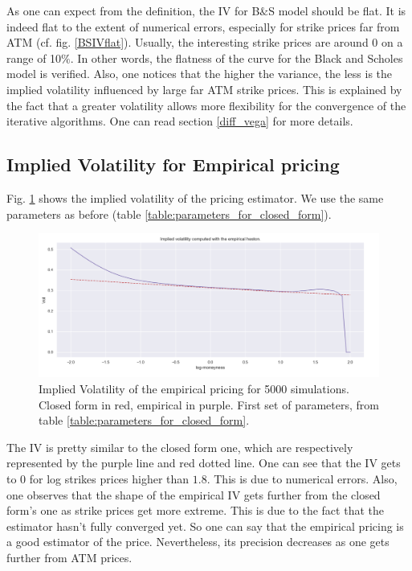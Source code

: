 As one can expect from the definition, the IV for B$\&$S model should be flat. It is indeed flat to the extent of numerical errors, especially for strike prices far from ATM (cf. fig. \ref{BSIVflat}). Usually, the interesting strike prices are around $0$ on a range of 10$\%$. In other words, the flatness of the curve for the Black and Scholes model is verified. Also, one notices that the higher the variance, the less is the implied volatility influenced by large far ATM strike prices. This is explained by the fact that a greater volatility allows more flexibility for the convergence of the iterative algorithms. One can read section  \ref{diff_vega} for more details.

\subsection{Implied Volatility for Empirical pricing}
\label{section:IVempirical}
Fig. \ref{fig:IVempirical} shows the implied volatility of the pricing estimator. We use the same parameters as before (table \ref{table:parameters_for_closed_form}).

\begin{figure}
\centering
\includegraphics[width = 0.7 \textwidth]{../addition_part/images/integration_fft/IVempirical.png}
\caption{Implied Volatility of the empirical pricing for 5000 simulations. Closed form in red, empirical in purple. First set of parameters, from table \ref{table:parameters_for_closed_form}. }
\label{fig:IVempirical}
\end{figure}

The IV is pretty similar to the closed form one, which are respectively represented by the purple line and red dotted line. One can see that the IV gets to $0$ for log strikes prices higher than $1.8$. This is due to numerical errors. Also, one observes that the shape of the empirical IV gets further from the closed form's one as strike prices get more extreme. This is due to the fact that the estimator hasn't fully converged yet. So one can say that the empirical pricing is a good estimator of the price. Nevertheless, its precision decreases as one gets further from ATM prices.

